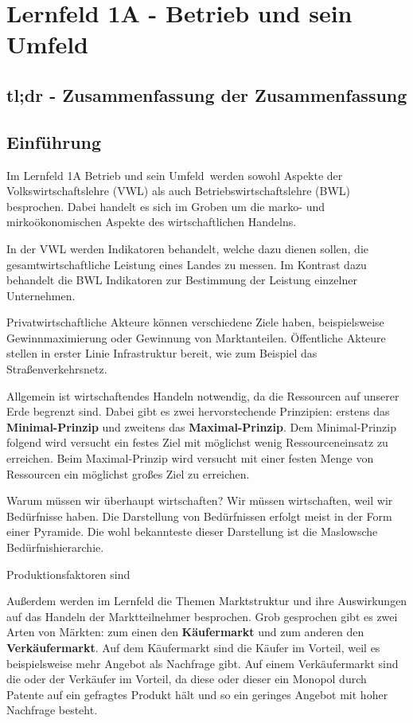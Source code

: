 \section{Lernfeld 1A - Betrieb und sein Umfeld}

\subsection{tl;dr - Zusammenfassung der Zusammenfassung}

\subsection{Einführung}
Im Lernfeld 1A \ql Betrieb und sein Umfeld\qr\ werden sowohl Aspekte der Volkswirtschaftslehre (VWL) als auch Betriebswirtschaftslehre (BWL) besprochen. Dabei handelt es sich im Groben um die marko- und mirkoökonomischen Aspekte des wirtschaftlichen Handelns.

In der VWL werden Indikatoren behandelt, welche dazu dienen sollen, die gesamtwirtschaftliche Leistung eines Landes zu messen. Im Kontrast dazu behandelt die BWL Indikatoren zur Bestimmung der Leistung einzelner Unternehmen.

Privatwirtschaftliche Akteure können verschiedene Ziele haben, beispielsweise Gewinnmaximierung oder Gewinnung von Marktanteilen. Öffentliche Akteure stellen in erster Linie Infrastruktur bereit, wie zum Beispiel das Straßenverkehrsnetz.

Allgemein ist wirtschaftendes Handeln notwendig, da die Ressourcen auf unserer Erde begrenzt sind. Dabei gibt es zwei hervorstechende Prinzipien: erstens das {\bf Minimal-Prinzip} und zweitens das {\bf Maximal-Prinzip}. Dem Minimal-Prinzip folgend wird versucht ein festes Ziel mit möglichst wenig Ressourceneinsatz zu erreichen. Beim Maximal-Prinzip wird versucht mit einer festen Menge von Ressourcen ein möglichst großes Ziel zu erreichen.

Warum müssen wir überhaupt wirtschaften? Wir müssen wirtschaften, weil wir Bedürfnisse haben. Die Darstellung von Bedürfnissen erfolgt meist in der Form einer Pyramide. Die wohl bekannteste dieser Darstellung ist die Maslowsche Bedürfnishierarchie.

Produktionsfaktoren sind 


Außerdem werden im Lernfeld die Themen Marktstruktur und ihre Auswirkungen auf das Handeln der Marktteilnehmer besprochen. Grob gesprochen gibt es zwei Arten von Märkten: zum einen den {\bf Käufermarkt} und zum anderen den {\bf Verkäufermarkt}. Auf dem Käufermarkt sind die Käufer im Vorteil, weil es beispielsweise mehr Angebot als Nachfrage gibt. Auf einem Verkäufermarkt sind die oder der Verkäufer im Vorteil, da diese oder dieser ein Monopol durch Patente auf ein gefragtes Produkt hält und so ein geringes Angebot mit hoher Nachfrage besteht.

